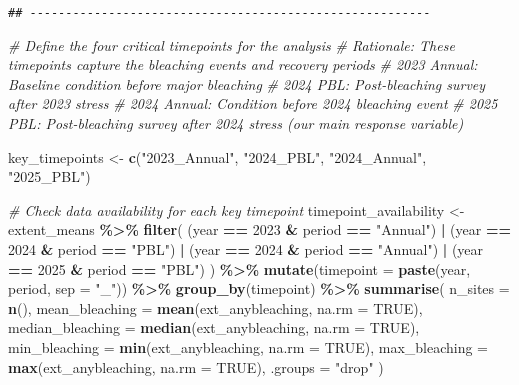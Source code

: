 \documentclass[
]{article}
\newenvironment{Shaded}{\begin{snugshade}}{\end{snugshade}}
\newcommand{\AttributeTok}[1]{\textcolor[rgb]{0.13,0.29,0.53}{#1}}
\newcommand{\CommentTok}[1]{\textcolor[rgb]{0.56,0.35,0.01}{\textit{#1}}}
\newcommand{\ConstantTok}[1]{\textcolor[rgb]{0.56,0.35,0.01}{#1}}
\newcommand{\DecValTok}[1]{\textcolor[rgb]{0.00,0.00,0.81}{#1}}
\newcommand{\FunctionTok}[1]{\textcolor[rgb]{0.13,0.29,0.53}{\textbf{#1}}}
\newcommand{\NormalTok}[1]{#1}
\newcommand{\OtherTok}[1]{\textcolor[rgb]{0.56,0.35,0.01}{#1}}
\newcommand{\SpecialCharTok}[1]{\textcolor[rgb]{0.81,0.36,0.00}{\textbf{#1}}}
\newcommand{\StringTok}[1]{\textcolor[rgb]{0.31,0.60,0.02}{#1}}
\begin{document}
\begin{verbatim}
## --------------------------------------------------------
\end{verbatim}

\begin{Shaded}
\begin{Highlighting}[]
\CommentTok{\# Define the four critical timepoints for the analysis}
\CommentTok{\# Rationale: These timepoints capture the bleaching events and recovery periods}
\CommentTok{\# 2023 Annual: Baseline condition before major bleaching}
\CommentTok{\# 2024 PBL: Post{-}bleaching survey after 2023 stress}
\CommentTok{\# 2024 Annual: Condition before 2024 bleaching event  }
\CommentTok{\# 2025 PBL: Post{-}bleaching survey after 2024 stress (our main response variable)}

\NormalTok{key\_timepoints }\OtherTok{\textless{}{-}} \FunctionTok{c}\NormalTok{(}\StringTok{"2023\_Annual"}\NormalTok{, }\StringTok{"2024\_PBL"}\NormalTok{, }\StringTok{"2024\_Annual"}\NormalTok{, }\StringTok{"2025\_PBL"}\NormalTok{)}

\CommentTok{\# Check data availability for each key timepoint}
\NormalTok{timepoint\_availability }\OtherTok{\textless{}{-}}\NormalTok{ extent\_means }\SpecialCharTok{\%\textgreater{}\%}
  \FunctionTok{filter}\NormalTok{(}
\NormalTok{    (year }\SpecialCharTok{==} \DecValTok{2023} \SpecialCharTok{\&}\NormalTok{ period }\SpecialCharTok{==} \StringTok{"Annual"}\NormalTok{) }\SpecialCharTok{|}
\NormalTok{      (year }\SpecialCharTok{==} \DecValTok{2024} \SpecialCharTok{\&}\NormalTok{ period }\SpecialCharTok{==} \StringTok{"PBL"}\NormalTok{) }\SpecialCharTok{|}
\NormalTok{      (year }\SpecialCharTok{==} \DecValTok{2024} \SpecialCharTok{\&}\NormalTok{ period }\SpecialCharTok{==} \StringTok{"Annual"}\NormalTok{) }\SpecialCharTok{|}
\NormalTok{      (year }\SpecialCharTok{==} \DecValTok{2025} \SpecialCharTok{\&}\NormalTok{ period }\SpecialCharTok{==} \StringTok{"PBL"}\NormalTok{)}
\NormalTok{  ) }\SpecialCharTok{\%\textgreater{}\%}
  \FunctionTok{mutate}\NormalTok{(}\AttributeTok{timepoint =} \FunctionTok{paste}\NormalTok{(year, period, }\AttributeTok{sep =} \StringTok{"\_"}\NormalTok{)) }\SpecialCharTok{\%\textgreater{}\%}
  \FunctionTok{group\_by}\NormalTok{(timepoint) }\SpecialCharTok{\%\textgreater{}\%}
  \FunctionTok{summarise}\NormalTok{(}
    \AttributeTok{n\_sites =} \FunctionTok{n}\NormalTok{(),}
    \AttributeTok{mean\_bleaching =} \FunctionTok{mean}\NormalTok{(ext\_anybleaching, }\AttributeTok{na.rm =} \ConstantTok{TRUE}\NormalTok{),}
    \AttributeTok{median\_bleaching =} \FunctionTok{median}\NormalTok{(ext\_anybleaching, }\AttributeTok{na.rm =} \ConstantTok{TRUE}\NormalTok{),}
    \AttributeTok{min\_bleaching =} \FunctionTok{min}\NormalTok{(ext\_anybleaching, }\AttributeTok{na.rm =} \ConstantTok{TRUE}\NormalTok{),}
    \AttributeTok{max\_bleaching =} \FunctionTok{max}\NormalTok{(ext\_anybleaching, }\AttributeTok{na.rm =} \ConstantTok{TRUE}\NormalTok{),}
    \AttributeTok{.groups =} \StringTok{"drop"}
\NormalTok{  )}


\end{Highlighting}
\end{Shaded}
\end{document}
